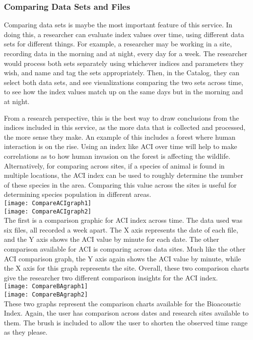 \subsubsection{Comparing Data Sets and Files}
Comparing data sets is maybe the most important feature of this service. In doing this, a researcher can evaluate index values over time, using different data sets for different things. For example, a researcher may be working in a site, recording data in the morning and at night, every day for a week. The researcher would process both sets separately using whichever indices and parameters they wish, and name and tag the sets appropriately. Then, in the Catalog, they can select both data sets, and see visualizations comparing the two sets across time, to see how the index values match up on the same days but in the morning and at night.\par
From a research perspective, this is the best way to draw conclusions from the indices included in this service, as the more data that is collected and processed, the more sense they make. An example of this includes a forest where human interaction is on the rise. Using an index like ACI over time will help to make correlations as to how human invasion on the forest is affecting the wildlife. Alternatively, for comparing across sites, if a species of animal is found in multiple locations, the ACI index can be used to roughly determine the number of these species in the area. Comparing this value across the sites is useful for determining species population in different areas.\\

\texttt{[image: CompareACIgraph1]}\\
\texttt{[image: CompareACIgraph2]}\\
The first is a comparison graphic for ACI index across time. The data used was six files, all recorded a week apart. The X axis represents the date of each file, and the Y axis shows the ACI value by minute for each date. The other comparison available for ACI is comparing across data sites. Much like the other ACI comparison graph, the Y axis again shows the ACI value by minute, while the X axis for this graph represents the site. Overall, these two comparison charts give the researcher two different comparison insights for the ACI index.\\

\texttt{[image: CompareBAgraph1]}\\
\texttt{[image: CompareBAgraph2]}\\
These two graphs represent the comparison charts available for the Bioacoustic Index. Again, the user has comparison across dates and research sites available to them. The brush is included to allow the user to shorten the observed time range as they please.\\

